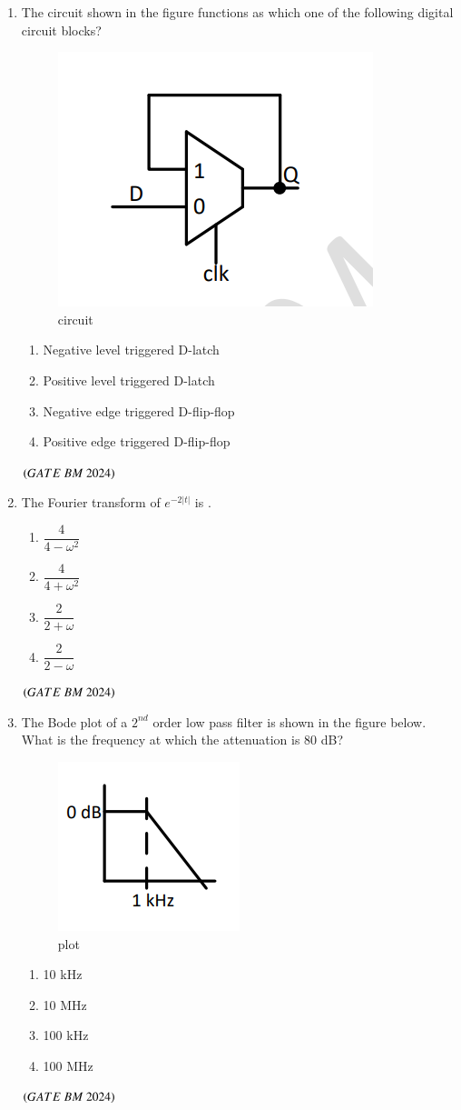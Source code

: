 \documentclass[journal,12pt,onecolumn]{IEEEtran}
\theoremstyle{remark}
\begin{document}
\begin{enumerate}
\item The circuit shown in the figure functions as which one of the following digital
circuit blocks?
\begin{figure}[H]
\centering
\includegraphics[width=0.2\columnwidth]{Figs/fig 2.png}
\caption{circuit}
\label{fig:placeholder}
\end{figure}
\begin{enumerate}[label=(\Alph*)]
\item Negative level triggered D-latch
\item Positive level triggered D-latch
\item Negative edge triggered D-flip-flop
\item Positive edge triggered D-flip-flop
\end{enumerate}
\hfill $\brak{GATE\ BM\ 2024}$

\item The Fourier transform of $e^{-2|t|}$ is \underline{\hspace{2cm}}.
\begin{enumerate}[label=(\Alph*)]
\item \quad $\dfrac{4}{4 - \omega^2}$ \\[10pt]
\item \quad $\dfrac{4}{4 + \omega^2}$ \\[10pt]
\item \quad $\dfrac{2}{2 + \omega}$ \\[10pt]
\item \quad $\dfrac{2}{2 - \omega}$
\end{enumerate}
\hfill $\brak{GATE\ BM\ 2024}$

\item The Bode plot of a $2^{nd}$ order low pass filter is shown in the figure below. What is the frequency at which the attenuation is 80 dB?
\begin{figure}[H]
\centering
\includegraphics[width=0.4\columnwidth]{Figs/Fig 3.png}
\caption{plot}
\label{fig:placeholder}
\end{figure}
\begin{enumerate}[label=(\Alph*)]
\item 10 kHz
\item 10 MHz
\item 100 kHz
\item 100 MHz
\end{enumerate}
\hfill $\brak{GATE\ BM\ 2024}$


\end{enumerate}
\end{document}
